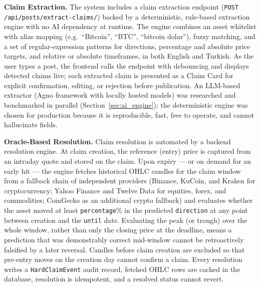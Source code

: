 \documentclass[a4paper,12pt]{report}
\begin{document}
\textbf{Claim Extraction.} The system includes a claim extraction endpoint (\texttt{POST /api/posts/extract-claims/}) backed by a deterministic, rule-based extraction engine with no AI dependency at runtime. The engine combines an asset whitelist with alias mapping (e.g.\ ``Bitcoin'', ``BTC'', ``bitcoin dolar''), fuzzy matching, and a set of regular-expression patterns for directions, percentage and absolute price targets, and relative or absolute timeframes, in both English and Turkish. As the user types a post, the frontend calls the endpoint with debouncing and displays detected claims live; each extracted claim is presented as a Claim Card for explicit confirmation, editing, or rejection before publication. An LLM-based extractor (Agno framework with locally hosted models) was researched and benchmarked in parallel (Section~\ref{sec:ai_engine}); the deterministic engine was chosen for production because it is reproducible, fast, free to operate, and cannot hallucinate fields.

\textbf{Oracle-Based Resolution.} Claim resolution is automated by a backend resolution engine. At claim creation, the reference (entry) price is captured from an intraday quote and stored on the claim. Upon expiry --- or on demand for an early hit --- the engine fetches historical OHLC candles for the claim window from a fallback chain of independent providers (Binance, KuCoin, and Kraken for cryptocurrency; Yahoo Finance and Twelve Data for equities, forex, and commodities; CoinGecko as an additional crypto fallback) and evaluates whether the asset moved at least \texttt{percentage}\% in the predicted \texttt{direction} at any point between creation and the \texttt{until} date. Evaluating the peak (or trough) over the whole window, rather than only the closing price at the deadline, means a prediction that was demonstrably correct mid-window cannot be retroactively falsified by a later reversal. Candles before claim creation are excluded so that pre-entry moves on the creation day cannot confirm a claim. Every resolution writes a \texttt{HardClaimEvent} audit record, fetched OHLC rows are cached in the database, resolution is idempotent, and a resolved status cannot revert.
\end{document}
